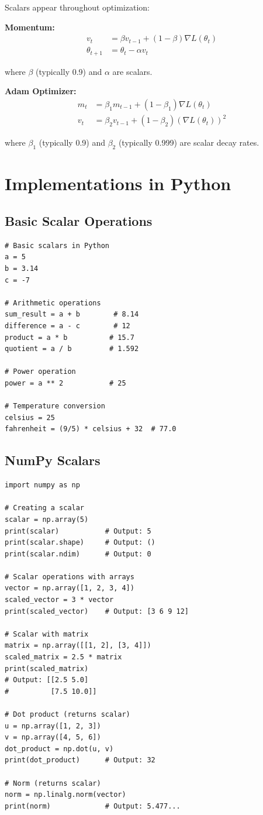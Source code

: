 \documentclass[11pt,a4paper]{article}
\begin{document}
Scalars appear throughout optimization:

\textbf{Momentum:}
\begin{align}
    v_t &= \beta v_{t-1} + (1-\beta) \nabla L(\theta_t) \\
    \theta_{t+1} &= \theta_t - \alpha v_t
\end{align}

where $\beta$ (typically 0.9) and $\alpha$ are scalars.

\textbf{Adam Optimizer:}
\begin{align}
    m_t &= \beta_1 m_{t-1} + (1-\beta_1) \nabla L(\theta_t) \\
    v_t &= \beta_2 v_{t-1} + (1-\beta_2) (\nabla L(\theta_t))^2
\end{align}

where $\beta_1$ (typically 0.9) and $\beta_2$ (typically 0.999) are scalar decay rates.

\section{Implementations in Python}

\subsection{Basic Scalar Operations}

\begin{lstlisting}
# Basic scalars in Python
a = 5
b = 3.14
c = -7

# Arithmetic operations
sum_result = a + b        # 8.14
difference = a - c        # 12
product = a * b          # 15.7
quotient = a / b         # 1.592

# Power operation
power = a ** 2           # 25

# Temperature conversion
celsius = 25
fahrenheit = (9/5) * celsius + 32  # 77.0
\end{lstlisting}

\subsection{NumPy Scalars}

\begin{lstlisting}
import numpy as np

# Creating a scalar
scalar = np.array(5)
print(scalar)           # Output: 5
print(scalar.shape)     # Output: ()
print(scalar.ndim)      # Output: 0

# Scalar operations with arrays
vector = np.array([1, 2, 3, 4])
scaled_vector = 3 * vector
print(scaled_vector)    # Output: [3 6 9 12]

# Scalar with matrix
matrix = np.array([[1, 2], [3, 4]])
scaled_matrix = 2.5 * matrix
print(scaled_matrix)
# Output: [[2.5 5.0]
#          [7.5 10.0]]

# Dot product (returns scalar)
u = np.array([1, 2, 3])
v = np.array([4, 5, 6])
dot_product = np.dot(u, v)
print(dot_product)      # Output: 32

# Norm (returns scalar)
norm = np.linalg.norm(vector)
print(norm)             # Output: 5.477...
\end{lstlisting}
\end{document}

